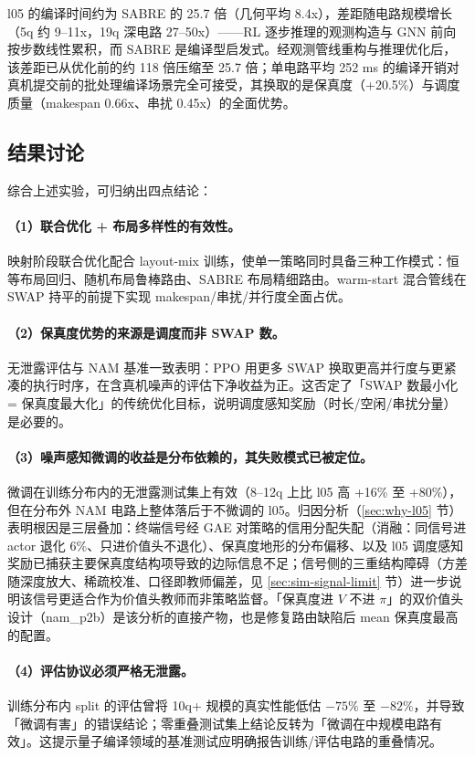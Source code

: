 l05 的编译时间约为 SABRE 的 25.7 倍（几何平均 8.4x），差距随电路规模增长（5q 约 9--11x，19q 深电路 27--50x）——RL 逐步推理的观测构造与 GNN 前向按步数线性累积，而 SABRE 是编译型启发式。经观测管线重构与推理优化后，该差距已从优化前的约 118 倍压缩至 25.7 倍；单电路平均 252 ms 的编译开销对真机提交前的批处理编译场景完全可接受，其换取的是保真度（+20.5\%）与调度质量（makespan 0.66x、串扰 0.45x）的全面优势。

\subsection{结果讨论}
\label{sec:results-discussion}

综合上述实验，可归纳出四点结论：

\paragraph{（1）联合优化 + 布局多样性的有效性。} 映射阶段联合优化配合 layout-mix 训练，使单一策略同时具备三种工作模式：恒等布局回归、随机布局鲁棒路由、SABRE 布局精细路由。warm-start 混合管线在 SWAP 持平的前提下实现 makespan/串扰/并行度全面占优。

\paragraph{（2）保真度优势的来源是调度而非 SWAP 数。} 无泄露评估与 NAM 基准一致表明：PPO 用更多 SWAP 换取更高并行度与更紧凑的执行时序，在含真机噪声的评估下净收益为正。这否定了「SWAP 数最小化 = 保真度最大化」的传统优化目标，说明调度感知奖励（时长/空闲/串扰分量）是必要的。

\paragraph{（3）噪声感知微调的收益是分布依赖的，其失败模式已被定位。} 微调在训练分布内的无泄露测试集上有效（8--12q 上比 l05 高 +16\% 至 +80\%），但在分布外 NAM 电路上整体落后于不微调的 l05。归因分析（\ref{sec:why-l05} 节）表明根因是三层叠加：终端信号经 GAE 对策略的信用分配失配（消融：同信号进 actor 退化 6\%、只进价值头不退化）、保真度地形的分布偏移、以及 l05 调度感知奖励已捕获主要保真度结构项导致的边际信息不足；信号侧的三重结构障碍（方差随深度放大、稀疏校准、口径即教师偏差，见 \ref{sec:sim-signal-limit} 节）进一步说明该信号更适合作为价值头教师而非策略监督。「保真度进 $V$ 不进 $\pi$」的双价值头设计（nam\_p2b）是该分析的直接产物，也是修复路由缺陷后 mean 保真度最高的配置。

\paragraph{（4）评估协议必须严格无泄露。} 训练分布内 split 的评估曾将 10q+ 规模的真实性能低估 $-75\%$ 至 $-82\%$，并导致「微调有害」的错误结论；零重叠测试集上结论反转为「微调在中规模电路有效」。这提示量子编译领域的基准测试应明确报告训练/评估电路的重叠情况。